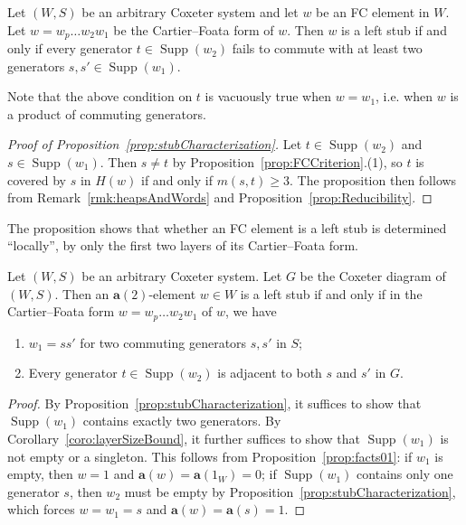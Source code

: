 \documentclass[ALCO,Unicode,published]{cedram}
\newcommand{\la}{\mathbf{a}}
\DeclareMathOperator{\supp}{\mathrm{Supp}}
\begin{document}
\begin{prop}
    \label{prop:stubCharacterization}
    Let $(W,S)$ be an arbitrary Coxeter system and let $w$ be an FC element in $W$. Let $w=w_p\dots w_2w_1$ be the
    Cartier--Foata form of $w$. Then $w$ is a left stub if and only if every generator $t\in \supp(w_2)$ fails to
    commute with at least two generators $s,s'\in \supp(w_1)$. 
\end{prop}

\begin{remark}
    Note that the above condition on $t$ is vacuously true when $w=w_1$, i.e. when $w$ is a product of commuting
    generators.
\end{remark}

\begin{proof}[Proof of Proposition~\ref{prop:stubCharacterization}]
    Let $t\in \supp(w_2)$ and $s\in \supp(w_1)$. Then $s\neq t$ by
    Proposition~\ref{prop:FCCriterion}.(1), so $t$ is covered by $s$ in $H(w)$ if and only if $m(s,t)\ge 3$.  The
    proposition then follows from Remark~\ref{rmk:heapsAndWords} and Proposition~\ref{prop:Reducibility}.
\end{proof}
\noindent 
The proposition shows that whether an FC element is a left stub is determined ``locally'', by only the first two
layers of its Cartier--Foata form. 

\begin{corollary}
    \label{coro:firstTwoLayers}
    Let $(W,S)$ be an arbitrary Coxeter system.  Let $G$ be the Coxeter diagram of $(W,S)$.  Then an
    $\la(2)$-element $w\in W$ is a left stub if and only if in the Cartier--Foata form $w=w_p\dots w_2w_1$ of $w$,
    we have 
    \begin{enumerate} 
        \item  $w_1=ss'$ for two commuting generators $s, s'$ in $S$;
        \item Every generator $t\in \supp(w_2)$ is adjacent to both $s$ and $s'$ in $G$.  
    \end{enumerate}
\end{corollary}

\begin{proof}
    By Proposition~\ref{prop:stubCharacterization}, it suffices to show that $\supp(w_1)$ contains exactly two
    generators.  By Corollary~\ref{coro:layerSizeBound}, it further suffices to show that
    $\supp(w_1)$ is not empty or a singleton.  This follows from Proposition~\ref{prop:facts01}: if $w_1$ is
    empty, then $w=1$ and $\la(w)=\la(1_W)=0$; if $\supp(w_1)$ contains only one generator $s$, then
    $w_2$ must be empty by Proposition~\ref{prop:stubCharacterization}, which forces $w=w_1=s$ and
    $\la(w)=\la(s)=1$.    
\end{proof}
\end{document}
